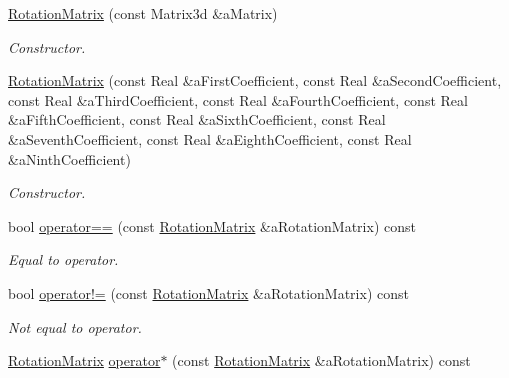 \begin{DoxyCompactItemize}
\item 
\hyperlink{classlibrary_1_1math_1_1geom_1_1d3_1_1trf_1_1rot_1_1_rotation_matrix_a7f1184694020cb4f963d58931324ab06}{Rotation\+Matrix} (const Matrix3d \&a\+Matrix)
\begin{DoxyCompactList}\small\item\em Constructor. \end{DoxyCompactList}\item 
\hyperlink{classlibrary_1_1math_1_1geom_1_1d3_1_1trf_1_1rot_1_1_rotation_matrix_a7618d97ef4861054a071a3431176c3a1}{Rotation\+Matrix} (const Real \&a\+First\+Coefficient, const Real \&a\+Second\+Coefficient, const Real \&a\+Third\+Coefficient, const Real \&a\+Fourth\+Coefficient, const Real \&a\+Fifth\+Coefficient, const Real \&a\+Sixth\+Coefficient, const Real \&a\+Seventh\+Coefficient, const Real \&a\+Eighth\+Coefficient, const Real \&a\+Ninth\+Coefficient)
\begin{DoxyCompactList}\small\item\em Constructor. \end{DoxyCompactList}\item 
bool \hyperlink{classlibrary_1_1math_1_1geom_1_1d3_1_1trf_1_1rot_1_1_rotation_matrix_adb54de25b2dbdd55ecd6d122f47b5996}{operator==} (const \hyperlink{classlibrary_1_1math_1_1geom_1_1d3_1_1trf_1_1rot_1_1_rotation_matrix}{Rotation\+Matrix} \&a\+Rotation\+Matrix) const
\begin{DoxyCompactList}\small\item\em Equal to operator. \end{DoxyCompactList}\item 
bool \hyperlink{classlibrary_1_1math_1_1geom_1_1d3_1_1trf_1_1rot_1_1_rotation_matrix_a7aabde35abe3bf30b5f38ab986e64f34}{operator!=} (const \hyperlink{classlibrary_1_1math_1_1geom_1_1d3_1_1trf_1_1rot_1_1_rotation_matrix}{Rotation\+Matrix} \&a\+Rotation\+Matrix) const
\begin{DoxyCompactList}\small\item\em Not equal to operator. \end{DoxyCompactList}\item 
\hyperlink{classlibrary_1_1math_1_1geom_1_1d3_1_1trf_1_1rot_1_1_rotation_matrix}{Rotation\+Matrix} \hyperlink{classlibrary_1_1math_1_1geom_1_1d3_1_1trf_1_1rot_1_1_rotation_matrix_aa3b9e906bba954c71fd54b2cadfea46f}{operator$\ast$} (const \hyperlink{classlibrary_1_1math_1_1geom_1_1d3_1_1trf_1_1rot_1_1_rotation_matrix}{Rotation\+Matrix} \&a\+Rotation\+Matrix) const

\end{DoxyCompactItemize}

